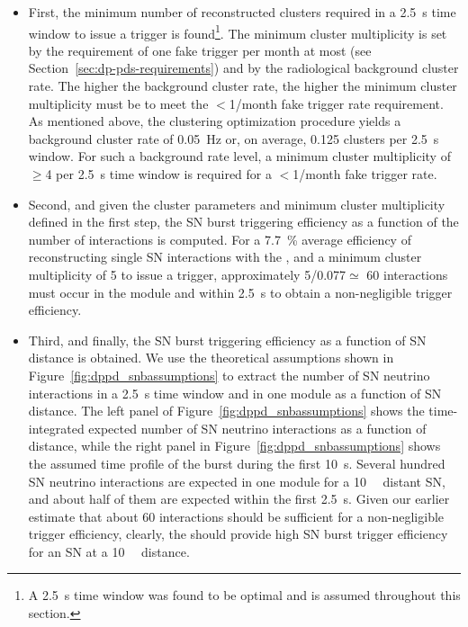 \begin{itemize}
\item First, the minimum number of reconstructed clusters required in a \SI{2.5}{\s} time window  to issue a trigger is found\footnote{A \SI{2.5}{\s} time window was found to be optimal and is assumed throughout this section.}. The minimum cluster multiplicity is set by the requirement of one fake trigger per month at most (see Section~\ref{sec:dp-pds-requirements}) and by the radiological background cluster rate. The higher the background cluster rate, the higher the minimum cluster multiplicity must be to meet the $<$\num{1}/month fake trigger rate requirement. As mentioned above, the clustering optimization procedure yields a background cluster rate of \SI{0.05}{\Hz} or, on average, \num{0.125} clusters per \SI{2.5}{\s} window. For such a background rate level, a minimum cluster multiplicity of $\ge$\num{4} per \SI{2.5}{\s} time window is required for a $<$\num{1}/month fake trigger rate.
%
\item Second, and given the cluster parameters and minimum cluster multiplicity defined in the first step, the SN burst triggering efficiency as a function of the number of  interactions is computed. For a \SI{7.7}{\%} average efficiency of reconstructing single SN  \nue interactions with the , and a minimum cluster multiplicity of \num{5} to issue a trigger, approximately \num{5}/\num{0.077}$\simeq$ \num{60} interactions must occur in the  module and within \SI{2.5}{\s} to obtain a non-negligible trigger efficiency. 
%
\item Third, and finally, the SN burst triggering efficiency as a function of SN distance is obtained. We use the theoretical assumptions shown in Figure~\ref{fig:dppd_snbassumptions} to extract the number of SN neutrino interactions in a \SI{2.5}{\s} time window and in one   module as a function of SN distance. The left panel of Figure~\ref{fig:dppd_snbassumptions} shows the time-integrated expected number of SN neutrino interactions as a function of distance, while the right panel in Figure~\ref{fig:dppd_snbassumptions} shows the assumed time profile of the burst during the first \SI{10}{\s}. Several hundred SN neutrino interactions are expected in one   module for a \SI{10}{\kilo\parsec} distant SN, and about half of them are expected within the first \SI{2.5}{\s}. Given our earlier estimate that about \num{60} interactions should be sufficient for a non-negligible trigger efficiency, clearly, the  should provide high SN burst trigger efficiency for an SN at a \SI{10}{\kilo\parsec} distance.
\end{itemize}

